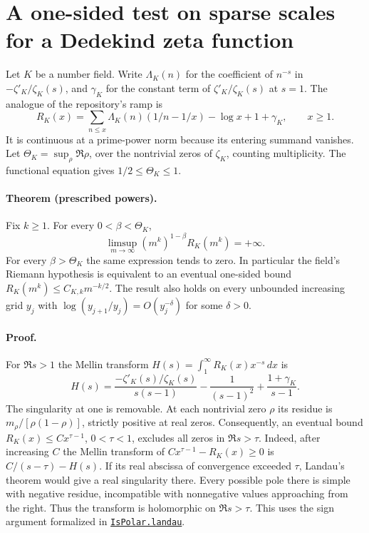 \section{A one-sided test on sparse scales for a Dedekind zeta function}

Let $K$ be a number field. Write $\Lambda_K(n)$ for the coefficient of
$n^{-s}$ in $-\zeta'_K/\zeta_K(s)$, and $\gamma_K$ for the constant term
of $\zeta'_K/\zeta_K(s)$ at $s=1$. The analogue of the repository's ramp is
\[
 R_K(x)=\sum_{n\le x}\Lambda_K(n)(1/n-1/x)-\log x+1+\gamma_K ,
 \qquad x\ge1.
\]
It is continuous at a prime-power norm because its entering summand vanishes.
Let $\Theta_K=\sup_\rho\Re\rho$, over the nontrivial zeros of $\zeta_K$,
counting multiplicity. The functional equation gives $1/2\le\Theta_K\le1$.

\paragraph{Theorem (prescribed powers).}
Fix $k\ge1$. For every $0<\beta<\Theta_K$,
\[
 \limsup_{m\to\infty}(m^k)^{1-\beta}R_K(m^k)=+\infty.
\]
For every $\beta>\Theta_K$ the same expression tends to zero.
In particular the field's Riemann hypothesis is equivalent to an eventual
one-sided bound $R_K(m^k)\le C_{K,k}m^{-k/2}$. The result also holds on every unbounded increasing
grid $y_j$ with $\log(y_{j+1}/y_j)=O(y_j^{-\delta})$ for some $\delta>0$.

\paragraph{Proof.}
For $\Re s>1$ the Mellin transform $H(s)=\int_1^\infty R_K(x)x^{-s}\,dx$ is
\[
 H(s)=\frac{-\zeta'_K(s)/\zeta_K(s)}{s(s-1)}
       -\frac{1}{(s-1)^2}+\frac{1+\gamma_K}{s-1}.
\]
The singularity at one is removable. At each nontrivial zero $\rho$ its
residue is $m_\rho/[\rho(1-\rho)]$, strictly positive at real zeros.
Consequently, an eventual bound $R_K(x)\le Cx^{\tau-1}$, $0<\tau<1$,
excludes all zeros in $\Re s>\tau$. Indeed, after increasing $C$ the
Mellin transform of $Cx^{\tau-1}-R_K(x)\ge0$ is $C/(s-\tau)-H(s)$.
If its real abscissa of convergence exceeded $\tau$, Landau's theorem
would give a real singularity there. Every possible pole there is simple
with negative residue, incompatible with nonnegative values approaching
from the right. Thus the transform is holomorphic on $\Re s>\tau$.
This uses the sign argument formalized in
\href{https://github.com/lsernau/grh-lean/blob/72fead102f663d5c7a407964a13dc0cf9d977207/grh/src/Lib/Analytic/Landau.lean}{\texttt{IsPolar.landau}}.


